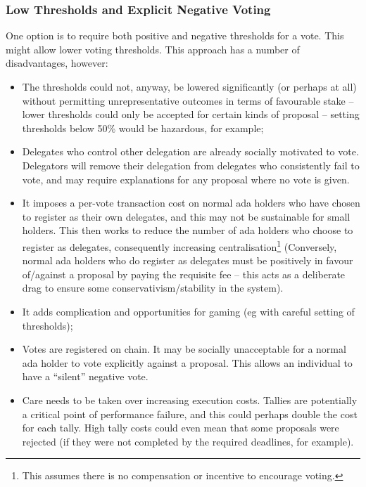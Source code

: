 \subsubsection*{Low Thresholds and Explicit Negative Voting}

One option is to require both positive and negative thresholds for a vote.  This might allow lower voting thresholds.
This approach has a number of disadvantages, however:

\begin{itemize}
\item
  The thresholds could not, anyway, be lowered significantly (or perhaps at all) without permitting unrepresentative outcomes in terms of
  favourable stake -- lower thresholds could only be accepted for certain kinds of proposal -- setting thresholds below 50\% would be hazardous, for example;
\item
  Delegates who control other delegation are already socially motivated to vote.  Delegators will remove their delegation from delegates who consistently fail to vote,
  and may require explanations for any proposal where no vote is given.
\item
  It imposes a per-vote transaction cost on normal ada holders who have chosen to register as their own delegates, and this may not be sustainable for small holders.
  This then works to reduce the number of ada holders who choose to register as delegates, consequently increasing centralisation\footnote{This assumes there is no compensation or incentive to encourage voting.}
  (Conversely, normal ada holders who do register as delegates must be positively in favour of/against a proposal by paying the requisite fee -- this acts as a deliberate drag
  to ensure some conservativism/stability in the system).
\item
  It adds complication and opportunities for gaming (eg with careful setting of thresholds);
\item
  Votes are registered on chain.  It may be socially unacceptable for a normal ada holder to vote explicitly against a proposal.  This allows an individual to have a ``silent'' negative vote.
\item
  Care needs to be taken over increasing execution costs. Tallies are potentially a critical point of performance failure, and this could perhaps double
  the cost for each tally.  High tally costs could even mean that some proposals were rejected (if they were not completed by the required deadlines, for example).
\end{itemize}
